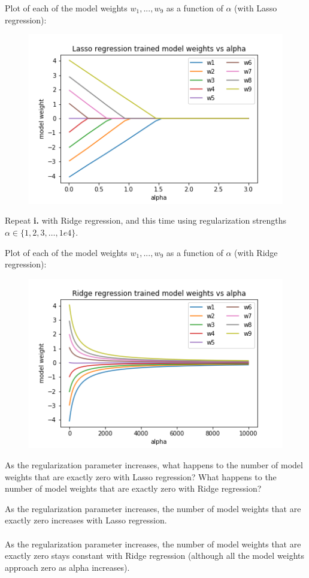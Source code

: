 Plot of each of the model weights $w_1, ..., w_9$ as a function of $\alpha$ (with Lasso regression):
\noindent
\begin{figure}[H]
\centering
\includegraphics[scale=0.6]{3a_plot_lasso.png}
\end{figure}
\noindent

\subproblem
Repeat \textbf{i.} with Ridge regression, and this time using regularization strengths $\alpha \in \{1, 2, 3, \ldots, 1e4\}$.

Plot of each of the model weights $w_1, ..., w_9$ as a function of $\alpha$ (with Ridge regression):
\noindent
\begin{figure}[H]
\centering
\includegraphics[scale=0.6]{3a_plot_ridge.png}
\end{figure}
\noindent

\subproblem
As the regularization parameter increases, what happens to the number of model weights that are exactly zero with Lasso regression?
What happens to the number of model weights that are exactly zero with Ridge regression?

As the regularization parameter increases, the number of model weights that are exactly zero increases with Lasso regression.\\
\\
As the regularization parameter increases, the number of model weights that are exactly zero stays constant with Ridge regression (although all the model weights approach zero as alpha increases).

